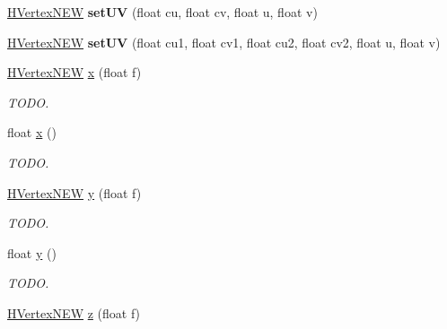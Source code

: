 \begin{DoxyCompactItemize}
\item 
\hypertarget{classhype_1_1extended_1_1util_1_1_h_vertex_n_e_w_a3b610545cc7b9d821960f9324b6c248d}{\hyperlink{classhype_1_1extended_1_1util_1_1_h_vertex_n_e_w}{H\-Vertex\-N\-E\-W} {\bfseries set\-U\-V} (float cu, float cv, float u, float v)}\label{classhype_1_1extended_1_1util_1_1_h_vertex_n_e_w_a3b610545cc7b9d821960f9324b6c248d}

\item 
\hypertarget{classhype_1_1extended_1_1util_1_1_h_vertex_n_e_w_a5417bed66f88b9251c6c4a39b881df00}{\hyperlink{classhype_1_1extended_1_1util_1_1_h_vertex_n_e_w}{H\-Vertex\-N\-E\-W} {\bfseries set\-U\-V} (float cu1, float cv1, float cu2, float cv2, float u, float v)}\label{classhype_1_1extended_1_1util_1_1_h_vertex_n_e_w_a5417bed66f88b9251c6c4a39b881df00}

\item 
\hyperlink{classhype_1_1extended_1_1util_1_1_h_vertex_n_e_w}{H\-Vertex\-N\-E\-W} \hyperlink{classhype_1_1extended_1_1util_1_1_h_vertex_n_e_w_a1c128e93775e0b8ee292fc7232135110}{x} (float f)
\begin{DoxyCompactList}\small\item\em T\-O\-D\-O. \end{DoxyCompactList}\item 
float \hyperlink{classhype_1_1extended_1_1util_1_1_h_vertex_n_e_w_a88dc678f903a648e8a546e9dce3489b2}{x} ()
\begin{DoxyCompactList}\small\item\em T\-O\-D\-O. \end{DoxyCompactList}\item 
\hyperlink{classhype_1_1extended_1_1util_1_1_h_vertex_n_e_w}{H\-Vertex\-N\-E\-W} \hyperlink{classhype_1_1extended_1_1util_1_1_h_vertex_n_e_w_a4a6c7257098318a1e500d8a28194bb7c}{y} (float f)
\begin{DoxyCompactList}\small\item\em T\-O\-D\-O. \end{DoxyCompactList}\item 
float \hyperlink{classhype_1_1extended_1_1util_1_1_h_vertex_n_e_w_ae52e4251b075170b5a4485386ad82575}{y} ()
\begin{DoxyCompactList}\small\item\em T\-O\-D\-O. \end{DoxyCompactList}\item 
\hyperlink{classhype_1_1extended_1_1util_1_1_h_vertex_n_e_w}{H\-Vertex\-N\-E\-W} \hyperlink{classhype_1_1extended_1_1util_1_1_h_vertex_n_e_w_abd5c5488e700e030e736ead377af5c32}{z} (float f)

\end{DoxyCompactItemize}
